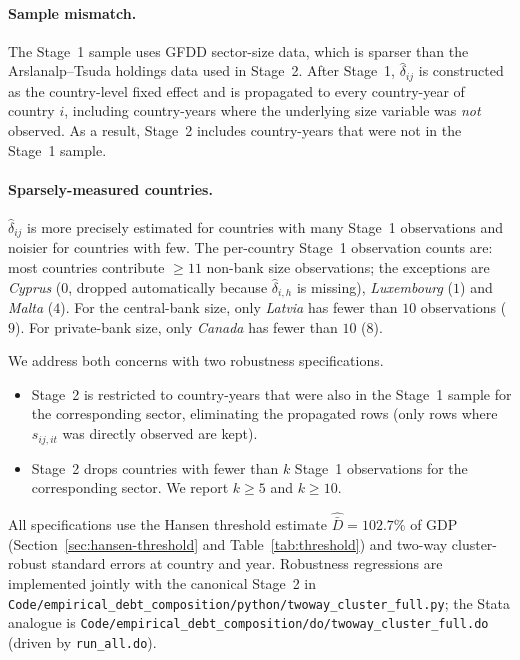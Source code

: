 \documentclass[\latexroot/\projectname]{subfiles}
\begin{document}
\paragraph{Sample mismatch.}
The Stage~1 sample uses GFDD sector-size data, which is sparser than
the Arslanalp--Tsuda holdings data used in Stage~2. After Stage~1,
$\hat\delta_{ij}$ is constructed as the country-level fixed effect
and is propagated to every country-year of country $i$, including
country-years where the underlying size variable was \emph{not}
observed. As a result, Stage~2 includes country-years that were not
in the Stage~1 sample.

\paragraph{Sparsely-measured countries.}
$\hat\delta_{ij}$ is more precisely estimated for countries with many
Stage~1 observations and noisier for countries with few. The
per-country Stage~1 observation counts are: most countries contribute
$\geq\!11$ non-bank size observations; the exceptions are
\textit{Cyprus} ($0$, dropped automatically because $\hat\delta_{i,h}$
is missing), \textit{Luxembourg} ($1$) and \textit{Malta} ($4$).
For the central-bank size, only \textit{Latvia} has fewer than $10$
observations ($9$). For private-bank size, only \textit{Canada}
has fewer than $10$ ($8$).

We address both concerns with two robustness specifications.

\begin{itemize}
  \item[\textbf{(2) Matched sample.}]
        Stage~2 is restricted to country-years that were also in the
        Stage~1 sample for the corresponding sector, eliminating the
        propagated rows (only rows where $s_{ij,it}$ was directly
        observed are kept).
  \item[\textbf{(3) Sparse-country drop.}]
        Stage~2 drops countries with fewer than $k$ Stage~1
        observations for the corresponding sector. We report
        $k\geq\!5$ and $k\geq\!10$.
\end{itemize}

All specifications use the Hansen threshold estimate
$\hat{\bar D}=102{.}7\%$ of GDP (Section~\ref{sec:hansen-threshold}
and Table~\ref{tab:threshold}) and two-way cluster-robust standard errors at
country and year. Robustness regressions are implemented jointly with the
canonical Stage~2 in
\texttt{Code/empirical\_debt\_composition/python/twoway\_cluster\_full.py}; the Stata analogue is
\texttt{Code/empirical\_debt\_composition/do/twoway\_cluster\_full.do}
(driven by \texttt{run\_all.do}).
\end{document}
